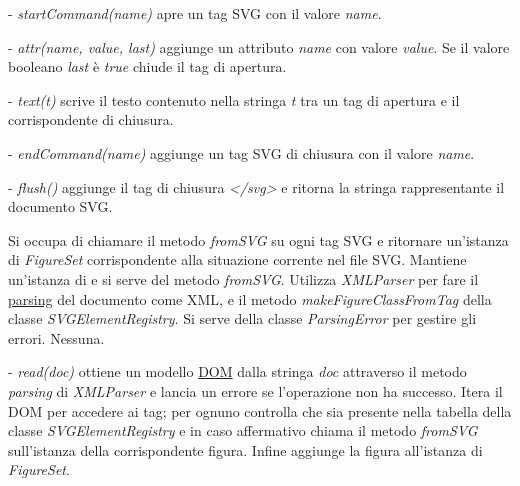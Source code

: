 \begin{elencopuntato}[\subsubsecindent]
\item[-]  \textit{startCommand(name)} apre un tag SVG con il valore \textit{name}. 
\item[-]  \textit{attr(name, value, last)} aggiunge un attributo \textit{name} con valore \textit{value}. Se il valore booleano \textit{last} \`e \textit{true} chiude il tag di apertura.
\item[-]  \textit{text(t)} scrive il testo contenuto nella stringa \textit{t} tra un tag di apertura e il corrispondente di chiusura.
\item[-]  \textit{endCommand(name)} aggiunge un tag SVG di chiusura con il valore \textit{name}.
\item[-]  \textit{flush()} aggiunge il tag di chiusura \textit{</svg>} e ritorna la stringa rappresentante il documento SVG.
\end{elencopuntato}


Si occupa di chiamare il metodo \textit{fromSVG} su ogni tag SVG e ritornare un'istanza di \textit{FigureSet} corrispondente alla situazione corrente nel file SVG.
Mantiene un'istanza di  e si serve del metodo \textit{fromSVG}.
Utilizza \textit{XMLParser} per fare il \underline{parsing} del documento come XML, e il metodo \textit{makeFigureClassFromTag} della classe \textit{SVGElementRegistry}.
Si serve della classe \textit{ParsingError} per gestire gli errori.
Nessuna.
\begin{elencopuntato}[\subsubsecindent]
\item[-]  \textit{read(doc)} ottiene un modello \underline{DOM} dalla stringa \textit{doc} attraverso il metodo \textit{parsing} di \textit{XMLParser} e lancia un errore se l'operazione non ha successo. Itera il DOM per accedere ai tag; per ognuno controlla che sia presente nella tabella della classe \textit{SVGElementRegistry} e in caso affermativo chiama il metodo \textit{fromSVG} sull'istanza della corrispondente figura. Infine aggiunge la figura all'istanza di \textit{FigureSet}.
\end{elencopuntato}

